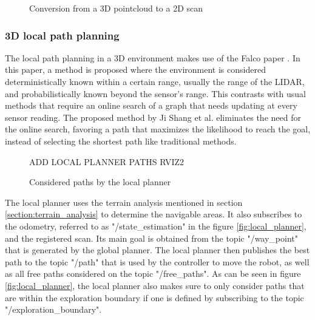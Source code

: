 \documentclass[12pt]{article}
\begin{document}
        \begin{figure}[h]
            \centering
            \resizebox{0.75\textwidth}{!}{%
            
            }   
            \caption{Conversion from a 3D pointcloud to a 2D scan}
            \label{fig:pointcloud_to_laserscan}
        \end{figure}
        
        
        \subsubsection{3D local path planning}
        \label{section:local_path_planning}

        The local path planning in a 3D environment makes use of the Falco paper \cite{zhang2020falco}. In this paper, a method is proposed where the environment is considered deterministically known within a certain range, usually the range of the LIDAR, and probabilistically known beyond the sensor's range. This contrasts with usual methods that require an online search of a graph that needs updating at every sensor reading. The proposed method by Ji Shang et al. eliminates the need for the online search, favoring a path that maximizes the likelihood to reach the goal, instead of selecting the shortest path like traditional methods.

        \begin{figure}[H]
            \centering
            \color{red}
            ADD LOCAL PLANNER PATHS RVIZ2
            \caption{Considered paths by the local planner}
        \end{figure}


        The local planner uses the terrain analysis mentioned in section \ref{section:terrain_analysis} to determine the navigable areas. It also subscribes to the odometry, referred to as "/state\_estimation" in the figure \ref{fig:local_planner}, and the registered scan. Its main goal is obtained from the topic "/way\_point" that is generated by the global planner. The local planner then publishes the best path to the topic "/path" that is used by the controller to move the robot, as well as all free paths considered on the topic "/free\_paths". As can be seen in figure \ref{fig:local_planner}, the local planner also makes sure to only consider paths that are within the exploration boundary if one is defined by subscribing to the topic "/exploration\_boundary".
\end{document}
